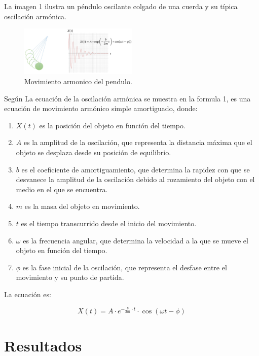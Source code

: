 \documentclass[conference]{IEEEtran}
\begin{document}
La imagen 1 ilustra un péndulo oscilante colgado de una cuerda y su típica oscilación armónica. 
\begin{figure}[h!]
    \centering
    \includegraphics[width=0.5\textwidth, keepaspectratio]{Figures/image1.png}
    \caption{Movimiento armonico del pendulo. \cite{aziz2022}}
    \label{fig:mi_etiqueta}
\end{figure}

Según \cite{aziz2022} La ecuación de la oscilación armónica se muestra en la formula 1, es una ecuación de movimiento armónico simple amortiguado, donde:

\begin{enumerate}
    \item $X(t)$ es la posición del objeto en función del tiempo.
    \item $A$ es la amplitud de la oscilación, que representa la distancia máxima que el objeto se desplaza desde su posición de equilibrio.
    \item $b$ es el coeficiente de amortiguamiento, que determina la rapidez con que se desvanece la amplitud de la oscilación debido al rozamiento del objeto con el medio en el que se encuentra.
    \item $m$ es la masa del objeto en movimiento.
    \item $t$ es el tiempo transcurrido desde el inicio del movimiento.
    \item $\omega$ es la frecuencia angular, que determina la velocidad a la que se mueve el objeto en función del tiempo.
    \item $\phi$ es la fase inicial de la oscilación, que representa el desfase entre el movimiento y su punto de partida.
\end{enumerate}

La ecuación es:

\begin{equation}
X(t) = A \cdot e^{-\frac{b}{2m} \cdot t} \cdot \cos(\omega t - \phi) 
\end{equation}


\section{Resultados}
\label{sec:Res}
\end{document}
